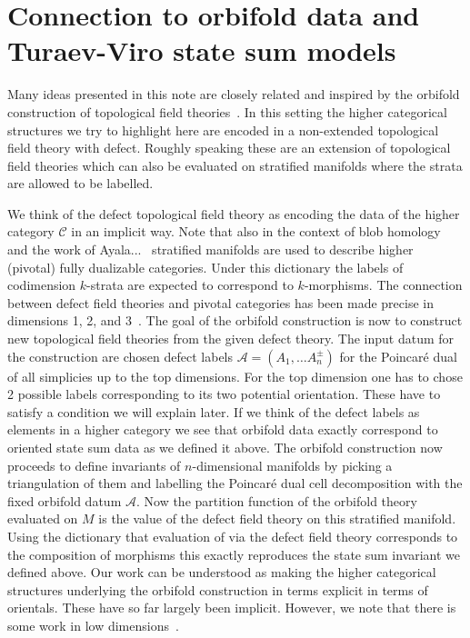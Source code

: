 \section{Connection to orbifold data and Turaev-Viro state sum models} 
Many ideas presented in this note are closely related and inspired by the orbifold construction of topological field theories~\cite{}. In this setting the higher categorical structures we try to highlight here are encoded in a non-extended topological field theory with defect. Roughly speaking these are an extension of topological field theories which can also be evaluated on stratified manifolds where the strata are allowed to be labelled.  

We think of the defect topological field theory as encoding the data of the higher category $\mathcal{C}$ in an implicit way. Note that also in the context of blob homology~\cite{} and the work of Ayala...~\cite{} stratified manifolds are used to describe higher (pivotal) fully dualizable categories.   
Under this dictionary the labels of codimension $k$-strata are expected to correspond to $k$-morphisms. 
The connection between defect field theories and pivotal categories has been made precise in dimensions 1, 2, and 3~\cite{}. 
The goal of the orbifold construction is now to construct new topological field theories from the given defect theory. 
The input datum for the construction are chosen defect labels $\mathcal{A}=(A_1,\dots A_n^{\pm})$ for the Poincaré dual of all simplicies up to the top dimensions. 
For the top dimension one has to chose 2 possible labels corresponding to its two potential orientation. 
These have to satisfy a condition we will explain later. 
If we think of the defect labels as elements in a higher category we see that orbifold data exactly correspond to oriented state sum data as we defined it above. 
The orbifold construction now proceeds to define invariants of $n$-dimensional manifolds by picking a triangulation of them and labelling the Poincaré dual cell decomposition with the fixed orbifold datum $\mathcal{A}$. 
Now the partition function of the orbifold theory evaluated on $M$ is the value of the defect field theory on this stratified manifold. 
Using the dictionary that evaluation of via the defect field theory corresponds to the composition of morphisms this exactly reproduces the state sum invariant we defined above. 
Our work can be understood as making the higher categorical structures underlying the orbifold construction in terms explicit in terms of orientals. 
These have so far largely been implicit. 
However, we note that there is some work in low dimensions~\cite{}\cite{}.    

